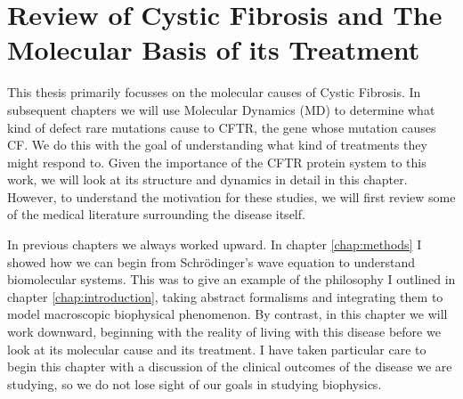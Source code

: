 \chapter{Review of Cystic Fibrosis and The Molecular Basis of its Treatment}
\label{chap:cftr}
\newpage





This thesis primarily focusses on the molecular causes of Cystic Fibrosis. In subsequent chapters we will use Molecular Dynamics (MD) to determine what kind of defect rare mutations cause to CFTR, the gene whose mutation causes CF. We do this with the goal of understanding what kind of treatments they might respond to. Given the importance of the CFTR protein system to this work, we will look at its structure and dynamics in detail in this chapter. However, to understand the motivation for these studies, we will first review some of the medical literature surrounding the disease itself. 

In previous chapters we always worked upward. In chapter \ref{chap:methods} I showed how we can begin from Schr\"odinger's wave equation to understand biomolecular systems. This was to give an example of the philosophy I outlined in chapter \ref{chap:introduction}, taking abstract formalisms and integrating them to model macroscopic biophysical phenomenon. By contrast, in this chapter we will work downward, beginning with the reality of living with this disease before we look at its molecular cause and its treatment. I have taken particular care to begin this chapter with a discussion of the clinical outcomes of the disease we are studying, so we do not lose sight of our goals in studying biophysics. 

